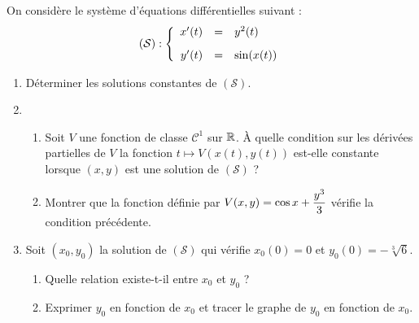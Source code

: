 \documentclass[a4paper, 11pt,reqno]{article}
\begin{document}
\begin{exercice}   \;
On consid\`ere le syst\`eme d'\'equations diff\'erentielles suivant :
$$(\mathcal{S}) : \left\{ \begin{array}{rcl}
x'(t) & = & y^2(t)\vsec\\
y'(t) & = & \sin (x(t))
\end{array} \right.$$
\begin{enumerate}
\item D\'eterminer les solutions constantes de $(\mathcal{S})$.
\item 
\begin{enumerate}
\item Soit $V$ une fonction de classe $\mathcal{C}^1$ sur $\mathbb{R}$. \`A quelle condition sur les d\'eriv\'ees partielles de $V$ la fonction $t\mapsto V(x(t),y(t))$ est-elle constante lorsque $(x,y)$ est une solution de  $(\mathcal{S})$ ?
\item Montrer que la fonction d\'efinie par $\displaystyle V(x,y) = \cos x + \frac{y^3}{3}$ v\'erifie la condition pr\'ec\'edente.
\end{enumerate}
\item Soit $(x_0,y_0)$ la solution de  $(\mathcal{S})$ qui v\'erifie $x_0(0) = 0$ et $y_0(0) = -\sqrt[3]{6}$.
\begin{enumerate}
\item Quelle relation existe-t-il entre $x_0$ et $y_0$ ?
\item Exprimer $y_0$ en fonction de $x_0$ et tracer le graphe de $y_0$ en fonction de $x_0$.
\end{enumerate}
\end{enumerate}
\end{exercice}
\end{document}

